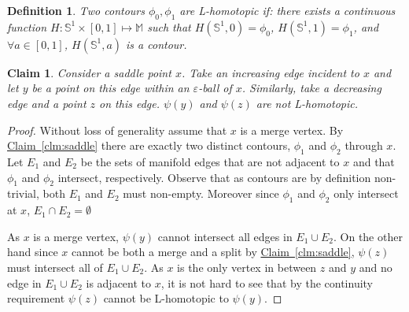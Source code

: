 \documentclass[11pt]{article}
\newtheorem{claim}[theorem]{Claim}
\newtheorem{definition}[theorem]{Definition}
\theoremstyle{definition}
\newcommand{\MM}{\mathbb{M}}
\newcommand{\SSS}{\mathbb{S}}
\newcommand{\eps}{\varepsilon}
\newcommand{\Clm}[1]{\hyperref[clm:#1]{Claim~\ref*{clm:#1}}} %
\begin{document}
{\begin{definition} \label{def:cont-hom} Two contours $\phi_0, \phi_1$ are \emph{L-homotopic}
if: there exists a continuous function $H:\SSS^1 \times [0,1] \mapsto \MM$
such that $H(\SSS^1,0) = \phi_0$, $H(\SSS^1,1) = \phi_1$, and $\forall a \in [0,1]$,
$H(\SSS^1,a)$ is a contour.
\end{definition}

\begin{claim} \label{clm:non-hom} Consider a saddle point $x$. Take an increasing edge incident to $x$
and let $y$ be a point on this edge within an $\eps$-ball of $x$. Similarly, take a decreasing edge
and a point $z$ on this edge. $\psi(y)$ and $\psi(z)$ are not L-homotopic.
\end{claim}

\begin{proof}
Without loss of generality assume that $x$ is a merge vertex.  By \Clm{saddle} there are exactly two distinct contours, 
$\phi_1$ and $\phi_2$ through $x$.  Let $E_1$ and $E_2$ be the sets of manifold edges that are not adjacent to $x$ and that $\phi_1$ and $\phi_2$ intersect, respectively.
Observe that as contours are by definition non-trivial, both $E_1$ and $E_2$ must non-empty.  Moreover since $\phi_1$ and $\phi_2$ only intersect at $x$, $E_1\cap E_2 = \emptyset$

As $x$ is a merge vertex, $\psi(y)$ cannot intersect all edges in $E_1 \cup E_2$.
On the other hand since $x$ cannot be both a merge and a split by \Clm{saddle}, $\psi(z)$ must intersect all of $E_1 \cup E_2$.  As $x$ is the only vertex in between $z$ and $y$ 
and no edge in $E_1\cup E_2$ is adjacent to $x$, it is not hard to see that by the continuity requirement $\psi(z)$ cannot be L-homotopic to $\psi(y)$.
%
%
% 
% 
\end{proof}

}
\end{document}
